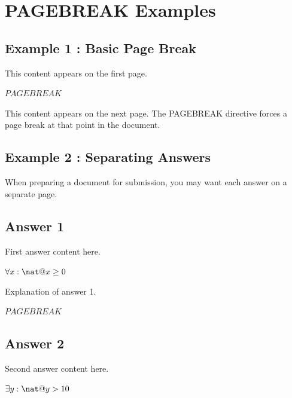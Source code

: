 \documentclass[a4paper,10pt,fleqn]{article}
\begin{document}
\section*{PAGEBREAK Examples}

\subsection*{Example 1 : Basic Page Break}

\noindent This content appears on the first page.

\bigskip

\noindent
$PAGEBREAK$


\noindent This content appears on the next page. The PAGEBREAK directive forces a page break at that point in the document.

\bigskip

\subsection*{Example 2 : Separating Answers}

\noindent When preparing a document for submission, you may want each answer on a separate page.

\bigskip

\subsection*{Answer 1}

\noindent First answer content here.

\bigskip

\noindent
$\forall x : \nat @ x \geq 0$


\noindent Explanation of answer 1.

\bigskip

\noindent
$PAGEBREAK$


\subsection*{Answer 2}

\noindent Second answer content here.

\bigskip

\noindent
$\exists y : \nat @ y > 10$
\end{document}
